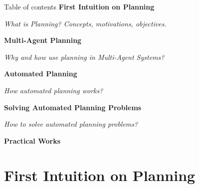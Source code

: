 \documentclass[9pt]{beamer}
\begin{document}
\begin{frame}[noframenumbering]{Table of contents}
	\textcolor{CS-2}{\textbullet \hskip5pt \textbf{First Intuition on Planning}}\\
	\begin{small}
		\emph{What is Planning? Concepts, motivations, objectives.}\\
	\end{small}
	
	\vspace{4mm}
	
	\textcolor{CS-2}{\textbullet \hskip5pt \textbf{Multi-Agent Planning}}\\
	\begin{small}
		\emph{Why and how use planning in Multi-Agent Systems?}\\
	\end{small}
	
	\vspace{4mm}
	
	\textcolor{CS-2}{\textbullet \hskip5pt \textbf{Automated Planning}}\\
	\begin{small}
	    \emph{How automated planning works?}\\
	\end{small}
	
	\vspace{4mm}
	
	\textcolor{CS-2}{\textbullet \hskip5pt \textbf{Solving Automated Planning Problems}}\\
	\begin{small}
	    \emph{How to solve automated planning problems?}\\
	\end{small}
	
	\vspace{4mm}
	
	\textcolor{CS-2}{\textbullet \hskip5pt \textbf{Practical Works}}\\
	\begin{small}
	    \emph{}
	\end{small}
	
\end{frame}
\endgroup


\section{First Intuition on Planning}
\end{document}
